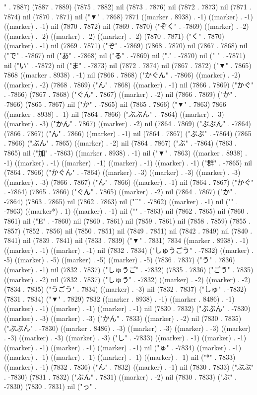 {" . 7887) (7887 . 7889) (7875 . 7882) nil (7873 . 7876) nil (7872 . 7873) nil (7871 . 7874) nil (7870 . 7871) nil ("▼" . 7868) 7871 ((marker . 8938) . -1) ((marker) . -1) ((marker) . -1) nil (7870 . 7872) nil (7869 . 7870) ("ぞく" . -7869) ((marker) . -2) ((marker) . -2) ((marker) . -2) ((marker) . -2) (7870 . 7871) ("く" . 7870) ((marker) . -1) nil (7869 . 7871) ("ぞ" . -7869) (7868 . 7870) nil (7867 . 7868) nil ("で" . -7867) nil ("あ" . -7868) nil ("る" . -7869) nil ("." . -7870) nil (" " . -7871) nil ("い" . -7872) nil ("ま" . -7873) nil (7872 . 7874) nil (7867 . 7872) ("▼" . 7865) 7868 ((marker . 8938) . -1) nil (7866 . 7868) ("かぐん" . -7866) ((marker) . -2) ((marker) . -2) (7868 . 7869) ("ん" . 7868) ((marker) . -1) nil (7866 . 7869) ("かぐ" . -7866) (7867 . 7868) ("ぐん" . 7867) ((marker) . -2) nil (7866 . 7869) ("か" . -7866) (7865 . 7867) nil ("か" . -7865) nil (7865 . 7866) ("▼" . 7863) 7866 ((marker . 8938) . -1) nil (7864 . 7866) ("ぶぶん" . -7864) ((marker) . -3) ((marker) . -3) ("かん" . 7867) ((marker) . -2) nil (7864 . 7869) ("ぶぶん" . -7864) (7866 . 7867) ("ん" . 7866) ((marker) . -1) nil (7864 . 7867) ("ぶぶ" . -7864) (7865 . 7866) ("ぶん" . 7865) ((marker) . -2) nil (7864 . 7867) ("ぶ" . -7864) (7863 . 7865) nil ("加" . -7863) ((marker . 8938) . -1) nil ("▼" . 7863) ((marker . 8938) . -1) ((marker) . -1) ((marker) . -1) ((marker) . -1) ((marker) . -1) ("群" . -7865) nil (7864 . 7866) ("かぐん" . -7864) ((marker) . -3) ((marker) . -3) ((marker) . -3) ((marker) . -3) (7866 . 7867) ("ん" . 7866) ((marker) . -1) nil (7864 . 7867) ("かぐ" . -7864) (7865 . 7866) ("ぐん" . 7865) ((marker) . -2) nil (7864 . 7867) ("か" . -7864) (7863 . 7865) nil (7862 . 7863) nil ("^" . -7862) ((marker) . -1) nil ("}" . -7863) ((marker*) . 1) ((marker) . -1) nil ("{" . -7863) nil (7862 . 7865) nil (7860 . 7861) nil ("E" . -7860) nil (7860 . 7861) nil (7859 . 7861) nil (7858 . 7859) (7855 . 7857) (7852 . 7856) nil (7850 . 7851) nil (7849 . 7851) nil (7842 . 7849) nil (7840 . 7841) nil (7839 . 7841) nil (7833 . 7839) ("▼" . 7831) 7834 ((marker . 8938) . -1) ((marker) . -1) ((marker) . -1) nil (7832 . 7834) ("しゅうごう" . -7832) ((marker) . -5) ((marker) . -5) ((marker) . -5) ((marker) . -5) (7836 . 7837) ("う" . 7836) ((marker) . -1) nil (7832 . 7837) ("しゅうご" . -7832) (7835 . 7836) ("ごう" . 7835) ((marker) . -2) nil (7832 . 7837) ("しゅう" . -7832) ((marker) . -2) ((marker) . -2) (7834 . 7835) ("うごう" . 7834) ((marker) . -3) nil (7832 . 7837) ("しゅ" . -7832) (7831 . 7834) ("▼" . 7829) 7832 ((marker . 8938) . -1) ((marker . 8486) . -1) ((marker) . -1) ((marker) . -1) ((marker) . -1) nil (7830 . 7832) ("ぶぶん" . -7830) ((marker) . -3) ((marker) . -3) ("かん" . 7833) ((marker) . -2) nil (7830 . 7835) ("ぶぶん" . -7830) ((marker . 8486) . -3) ((marker) . -3) ((marker) . -3) ((marker) . -3) ((marker) . -3) ((marker) . -3) ("し" . -7833) ((marker) . -1) ((marker) . -1) ((marker) . -1) ((marker) . -1) ((marker) . -1) nil ("ゅ" . -7834) ((marker) . -1) ((marker) . -1) ((marker) . -1) ((marker) . -1) ((marker) . -1) nil ("*" . 7833) ((marker) . -1) (7832 . 7836) ("ん" . 7832) ((marker) . -1) nil (7830 . 7833) ("ぶぶ" . -7830) (7831 . 7832) ("ぶん" . 7831) ((marker) . -2) nil (7830 . 7833) ("ぶ" . -7830) (7830 . 7831) nil ("っ" . }
